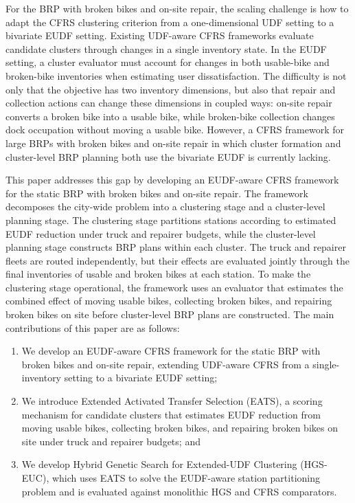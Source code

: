 For the BRP with broken bikes and on-site repair, the scaling challenge is how
to adapt the CFRS clustering criterion from a one-dimensional UDF setting to a
bivariate EUDF setting. Existing UDF-aware CFRS frameworks evaluate candidate
clusters through changes in a single inventory state. In the EUDF setting, a
cluster evaluator must account for changes in both usable-bike and broken-bike
inventories when estimating user dissatisfaction. The difficulty is not only
that the objective has two inventory dimensions, but also that repair and
collection actions can change these dimensions in coupled ways: on-site repair
converts a broken bike into a usable bike, while broken-bike collection changes
dock occupation without moving a usable bike. However, a CFRS framework for
large BRPs with broken bikes and on-site repair in which cluster formation and
cluster-level BRP planning both use the bivariate EUDF is currently lacking.

This paper addresses this gap by developing an EUDF-aware CFRS framework for
the static BRP with broken bikes and on-site repair. The framework decomposes
the city-wide problem into a clustering stage and a cluster-level planning
stage. The clustering stage partitions stations according to estimated EUDF
reduction under truck and repairer budgets, while the cluster-level planning
stage constructs BRP plans within each cluster. The truck and repairer fleets
are routed independently, but their effects are evaluated jointly through the
final inventories of usable and broken bikes at each station. To make the
clustering stage operational, the framework uses an evaluator that estimates
the combined effect of moving usable bikes, collecting broken bikes, and
repairing broken bikes on site before cluster-level BRP plans are constructed.
The main contributions of this paper are as follows:
\begin{enumerate}
    \item We develop an EUDF-aware CFRS framework for the static BRP with
    broken bikes and on-site repair, extending UDF-aware CFRS from a
    single-inventory setting to a bivariate EUDF setting;
    \item We introduce Extended Activated Transfer Selection (EATS), a scoring
    mechanism for candidate clusters that estimates EUDF reduction from moving
    usable bikes, collecting broken bikes, and repairing broken bikes on site
    under truck and repairer budgets; and
    \item We develop Hybrid Genetic Search for Extended-UDF Clustering
    (HGS-EUC), which uses EATS to solve the EUDF-aware station partitioning
    problem and is evaluated against monolithic HGS and CFRS comparators.
\end{enumerate}

